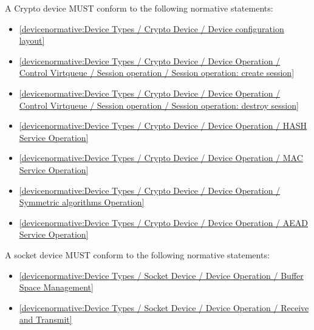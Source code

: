 \label{sec:Conformance / Device Conformance / Crypto Device Conformance}

A Crypto device MUST conform to the following normative statements:

\begin{itemize}
\item \ref{devicenormative:Device Types / Crypto Device / Device configuration layout}
\item \ref{devicenormative:Device Types / Crypto Device / Device Operation / Control Virtqueue / Session operation / Session operation: create session}
\item \ref{devicenormative:Device Types / Crypto Device / Device Operation / Control Virtqueue / Session operation / Session operation: destroy session}
\item \ref{devicenormative:Device Types / Crypto Device / Device Operation / HASH Service Operation}
\item \ref{devicenormative:Device Types / Crypto Device / Device Operation / MAC Service Operation}
\item \ref{devicenormative:Device Types / Crypto Device / Device Operation / Symmetric algorithms Operation}
\item \ref{devicenormative:Device Types / Crypto Device / Device Operation / AEAD Service Operation}
\end{itemize}

\label{sec:Conformance / Device Conformance / Socket Device Conformance}

A socket device MUST conform to the following normative statements:

\begin{itemize}
\item \ref{devicenormative:Device Types / Socket Device / Device Operation / Buffer Space Management}
\item \ref{devicenormative:Device Types / Socket Device / Device Operation / Receive and Transmit}
\end{itemize}

\label{sec:Conformance / Device Conformance / File System Device Conformance}

